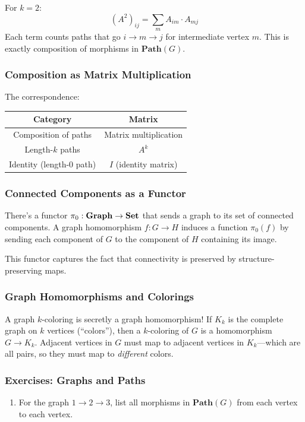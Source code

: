 \begin{goingdeeper}
For $k = 2$:
\[
(A^2)_{ij} = \sum_m A_{im} \cdot A_{mj}
\]
Each term counts paths that go $i \to m \to j$ for intermediate vertex $m$. This is exactly composition of morphisms in $\mathbf{Path}(G)$.

\subsubsection*{Composition as Matrix Multiplication}

The correspondence:
\begin{center}
\begin{tabular}{cc}
\textbf{Category} & \textbf{Matrix} \\
\hline
Composition of paths & Matrix multiplication \\
Length-$k$ paths & $A^k$ \\
Identity (length-0 path) & $I$ (identity matrix)
\end{tabular}
\end{center}

\subsubsection*{Connected Components as a Functor}
There's a functor $\pi_0: \mathbf{Graph} \to \mathbf{Set}$ that sends a graph to its set of connected components. A graph homomorphism $f: G \to H$ induces a function $\pi_0(f)$ by sending each component of $G$ to the component of $H$ containing its image.

This functor captures the fact that connectivity is preserved by structure-preserving maps.

\subsubsection*{Graph Homomorphisms and Colorings}

A graph $k$-coloring is secretly a graph homomorphism! If $K_k$ is the complete graph on $k$ vertices (``colors''), then a $k$-coloring of $G$ is a homomorphism $G \to K_k$. Adjacent vertices in $G$ must map to adjacent vertices in $K_k$---which are all pairs, so they must map to \emph{different} colors.

\subsubsection*{Exercises: Graphs and Paths}

\begin{enumerate}
  \item For the graph $1 \to 2 \to 3$, list all morphisms in $\mathbf{Path}(G)$ from each vertex to each vertex.


\end{enumerate}
\end{goingdeeper}
